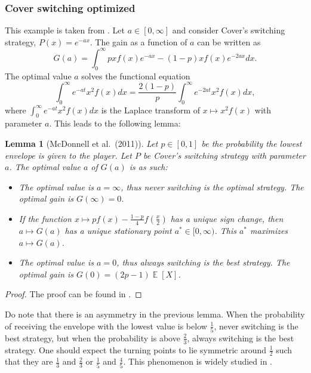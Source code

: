 \documentclass[a4paper]{report}
\theoremstyle{plain}
\newtheorem{lemma}[theorem]{Lemma}
\theoremstyle{definition}
\theoremstyle{remark}
\numberwithin{equation}{chapter}
\DeclareMathOperator{\E}{\mathbb{E}}
\DeclareMathOperator{\1}{\mathbbm{1}}
\begin{document}
\subsubsection{Cover switching optimized}
This example is taken from \cite{McDonnell11}. Let $a\in[0,\infty]$ and consider Cover's switching strategy, $P(x)=e^{-ax}$. The gain as a function of $a$ can be written as
\begin{equation}
G(a)=\int_0^\infty pxf(x)e^{-ax}-(1-p)xf(x)e^{-2ax}dx.
\end{equation}
The optimal value $a$ solves the functional equation
\begin{equation}
\int_0^\infty e^{-at}x^2f(x)dx=\frac{2(1-p)}{p}\int_0^\infty e^{-2at}x^2f(x)dx,
\end{equation}
where $\int_0^\infty e^{-at}x^2f(x)dx$ is the Laplace transform of $x\mapsto x^2f(x)$ with parameter $a$. This leads to the following lemma:
\begin{lemma}[McDonnell et al.~(2011)]
Let $p\in[0,1]$ be the probability the lowest envelope is given to the player. Let $P$ be Cover's switching strategy with parameter $a$. The optimal value $a$ of $G(a)$ is as such:
\begin{itemize}
    \item%
    The optimal value is $a=\infty$, thus never switching is the optimal strategy. The optimal gain is $G(\infty)=0$.
    \item%
    If the function $x\mapsto pf(x)-\frac{1-p}{4}f\left(\frac{x}{2}\right)$ has a unique sign change, then $a\mapsto G(a)$ has a unique stationary point $a^*\in[0,\infty)$. This $a^*$ maximizes $a\mapsto G(a)$.
    \item%
    The optimal value is $a=0$, thus always switching is the best strategy. The optimal gain is $G(0)=(2p-1)\E[X]$.
\end{itemize}
\end{lemma}
\begin{proof}
The proof can be found in \cite{McDonnell11}.
\end{proof}
Do note that there is an asymmetry in the previous lemma. When the probability of receiving the envelope with the lowest value is below $\frac{1}{5}$, never switching is the best strategy, but when the probability is above $\frac{2}{3}$, always switching is the best strategy. One should expect the turning points to lie symmetric around $\frac{1}{2}$ such that they are $\frac{1}{3}$ and $\frac{2}{3}$ or $\frac{1}{5}$ and $\frac{4}{5}$. This phenomenon is widely studied in \cite{McDonnell11}.
\end{document}
